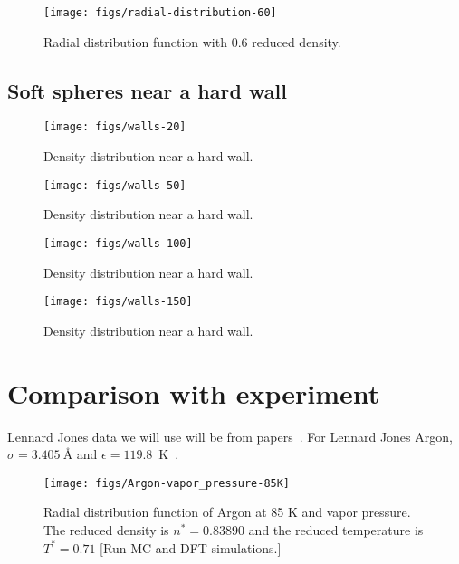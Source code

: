 \documentclass[letterpaper,twocolumn,amsmath,amssymb,prb]{revtex4-1}
\newcommand{\red}[1]{{\color{red} #1}}
\newcommand{\fixme}[1]{\red{[#1]}}
\begin{document}
\begin{figure}
\begin{center}
\texttt{[image: figs/radial-distribution-60]}
\end{center}
\caption{Radial distribution function with 0.6 reduced density.}
\label{fig:radial-distribution-60}
\end{figure}

\subsection{Soft spheres near a hard wall}

\begin{figure}
\begin{center}
\texttt{[image: figs/walls-20]}
\end{center}
\caption{Density distribution near a hard wall.}
\label{fig:walls-20}
\end{figure}

\begin{figure}
\begin{center}
\texttt{[image: figs/walls-50]}
\end{center}
\caption{Density distribution near a hard wall.}
\label{fig:walls-50}
\end{figure}

\begin{figure}
\begin{center}
\texttt{[image: figs/walls-100]}
\end{center}
\caption{Density distribution near a hard wall.}
\label{fig:walls-100}
\end{figure}

\begin{figure}
\begin{center}
\texttt{[image: figs/walls-150]}
\end{center}
\caption{Density distribution near a hard wall.}
\label{fig:walls-150}
\end{figure}

\section{Comparison with experiment}

Lennard Jones data we will use will be from
papers~\cite{mikolaj2004structure, eggert2002quantitative, yarnell1973structure}.
For Lennard Jones Argon, $\sigma = 3.405 ~\textrm{\AA}$ and $\epsilon = 119.8$~K~\cite{verlet1967computer}.
\begin{figure}
\begin{center}
\texttt{[image: figs/Argon-vapor\_pressure-85K]}
\end{center}
\caption{Radial distribution function of Argon at 85 K and vapor
  pressure.  The reduced density is $n^* = 0.83890$ and the reduced
  temperature is $T^* = 0.71$ \fixme{Run MC and DFT simulations.}}
\label{fig:argon-85K}
\end{figure}
\end{document}
